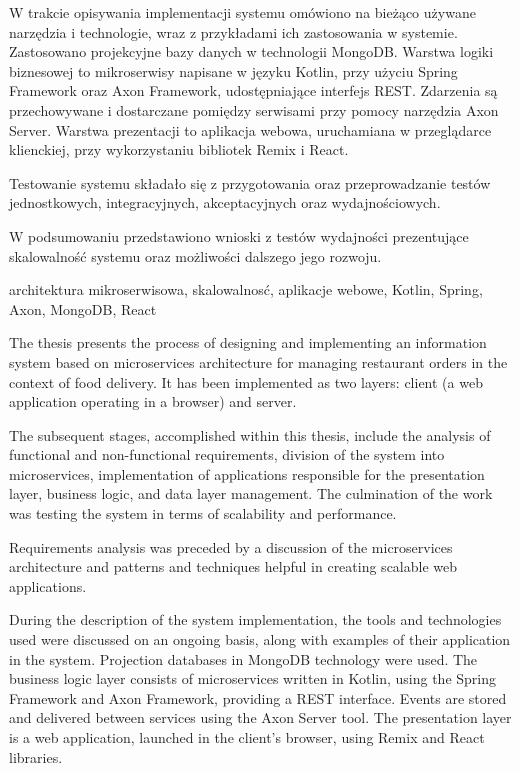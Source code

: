 \documentclass[
    bindingoffset=5mm,  %
    footnoteindent=3mm, %
    hyphenation=true    %
]{src/wut-thesis}
\begin{document}
W trakcie opisywania implementacji systemu omówiono na bieżąco używane narzędzia i technologie, wraz z przykładami ich zastosowania w systemie. Zastosowano projekcyjne bazy danych w technologii MongoDB. Warstwa logiki biznesowej to mikroserwisy napisane w języku Kotlin, przy użyciu Spring Framework oraz Axon Framework, udostępniające interfejs REST. Zdarzenia są przechowywane i dostarczane pomiędzy serwisami przy pomocy narzędzia Axon Server. Warstwa prezentacji to aplikacja webowa, uruchamiana w przeglądarce klienckiej, przy wykorzystaniu bibliotek Remix i React.

Testowanie systemu składało się z przygotowania oraz przeprowadzanie testów jednostkowych, integracyjnych, akceptacyjnych oraz wydajnościowych.

W podsumowaniu przedstawiono wnioski z testów wydajności prezentujące skalowalność systemu oraz możliwości dalszego jego rozwoju.

\keywords architektura mikroserwisowa, skalowalnosć, aplikacje webowe, Kotlin, Spring, Axon, MongoDB, React

\clearpage
\secondabstract

The thesis presents the process of designing and implementing an information system based on microservices architecture for managing restaurant orders in the context of food delivery. It has been implemented as two layers: client (a web application operating in a browser) and server.

The subsequent stages, accomplished within this thesis, include the analysis of functional and non-functional requirements, division of the system into microservices, implementation of applications responsible for the presentation layer, business logic, and data layer management. The culmination of the work was testing the system in terms of scalability and performance.

Requirements analysis was preceded by a discussion of the microservices architecture and patterns and techniques helpful in creating scalable web applications.

During the description of the system implementation, the tools and technologies used were discussed on an ongoing basis, along with examples of their application in the system. Projection databases in MongoDB technology were used. The business logic layer consists of microservices written in Kotlin, using the Spring Framework and Axon Framework, providing a REST interface. Events are stored and delivered between services using the Axon Server tool. The presentation layer is a web application, launched in the client's browser, using Remix and React libraries.
\end{document}
